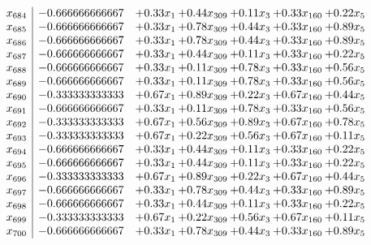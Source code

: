 \documentclass[8pt]{article}
\begin{document}
\[\begin{array}{c| c c@{\hskip 2pt} c@{\hskip 2pt} c@{\hskip 2pt} c@{\hskip 2pt} c@{\hskip 2pt} }
 x_{684}   &  -0.666666666667 & +  0.33 x_{1} & +  0.44 x_{309} & +  0.11 x_{3} & +  0.33 x_{160} & +  0.22 x_{5}\\
 x_{685}   &  -0.666666666667 & +  0.33 x_{1} & +  0.78 x_{309} & +  0.44 x_{3} & +  0.33 x_{160} & +  0.89 x_{5}\\
 x_{686}   &  -0.666666666667 & +  0.33 x_{1} & +  0.78 x_{309} & +  0.44 x_{3} & +  0.33 x_{160} & +  0.89 x_{5}\\
 x_{687}   &  -0.666666666667 & +  0.33 x_{1} & +  0.44 x_{309} & +  0.11 x_{3} & +  0.33 x_{160} & +  0.22 x_{5}\\
 x_{688}   &  -0.666666666667 & +  0.33 x_{1} & +  0.11 x_{309} & +  0.78 x_{3} & +  0.33 x_{160} & +  0.56 x_{5}\\
 x_{689}   &  -0.666666666667 & +  0.33 x_{1} & +  0.11 x_{309} & +  0.78 x_{3} & +  0.33 x_{160} & +  0.56 x_{5}\\
 x_{690}   &  -0.333333333333 & +  0.67 x_{1} & +  0.89 x_{309} & +  0.22 x_{3} & +  0.67 x_{160} & +  0.44 x_{5}\\
 x_{691}   &  -0.666666666667 & +  0.33 x_{1} & +  0.11 x_{309} & +  0.78 x_{3} & +  0.33 x_{160} & +  0.56 x_{5}\\
 x_{692}   &  -0.333333333333 & +  0.67 x_{1} & +  0.56 x_{309} & +  0.89 x_{3} & +  0.67 x_{160} & +  0.78 x_{5}\\
 x_{693}   &  -0.333333333333 & +  0.67 x_{1} & +  0.22 x_{309} & +  0.56 x_{3} & +  0.67 x_{160} & +  0.11 x_{5}\\
 x_{694}   &  -0.666666666667 & +  0.33 x_{1} & +  0.44 x_{309} & +  0.11 x_{3} & +  0.33 x_{160} & +  0.22 x_{5}\\
 x_{695}   &  -0.666666666667 & +  0.33 x_{1} & +  0.44 x_{309} & +  0.11 x_{3} & +  0.33 x_{160} & +  0.22 x_{5}\\
 x_{696}   &  -0.333333333333 & +  0.67 x_{1} & +  0.89 x_{309} & +  0.22 x_{3} & +  0.67 x_{160} & +  0.44 x_{5}\\
 x_{697}   &  -0.666666666667 & +  0.33 x_{1} & +  0.78 x_{309} & +  0.44 x_{3} & +  0.33 x_{160} & +  0.89 x_{5}\\
 x_{698}   &  -0.666666666667 & +  0.33 x_{1} & +  0.44 x_{309} & +  0.11 x_{3} & +  0.33 x_{160} & +  0.22 x_{5}\\
 x_{699}   &  -0.333333333333 & +  0.67 x_{1} & +  0.22 x_{309} & +  0.56 x_{3} & +  0.67 x_{160} & +  0.11 x_{5}\\
 x_{700}   &  -0.666666666667 & +  0.33 x_{1} & +  0.78 x_{309} & +  0.44 x_{3} & +  0.33 x_{160} & +  0.89 x_{5}\\

\end{array}\]
\end{document}
